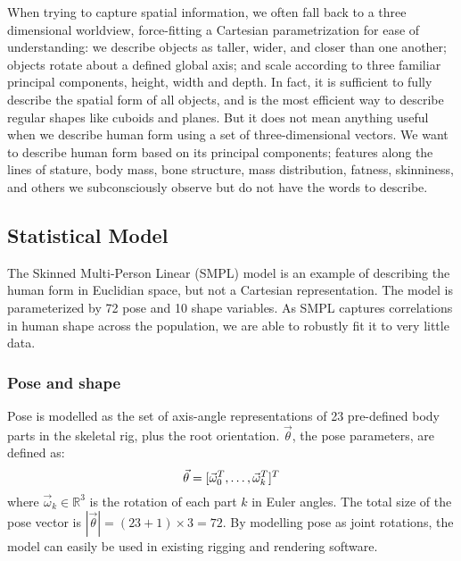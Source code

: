 \documentclass[9pt,twocolumn]{article}
\begin{document}
		\par{When trying to capture spatial information, we often fall back to a three dimensional
		worldview, force-fitting a Cartesian parametrization for ease of understanding: we describe
		objects as taller, wider, and closer than one another; objects rotate about a defined global axis;
		and scale according to three familiar principal components, height, width and depth. In fact, it
		is sufficient to fully describe the spatial form of all objects, and is the most efficient
		way to describe regular shapes like cuboids and planes. But it does not mean anything useful 	
		when we describe human form using a set of three-dimensional vectors. We want to describe
		human form based on its principal components; features along the lines of stature, body mass,
		bone structure, mass distribution, fatness, skinniness, and others we subconsciously observe
		but do not have the words to describe.}

	\subsection{Statistical Model}

		\par{The Skinned Multi-Person Linear (SMPL) model is an example of describing the human form
			in Euclidian space, but not a Cartesian representation. The model is parameterized by 72
			pose and 10 shape variables. As SMPL captures correlations in human shape across the population,
			we are able to robustly fit it to very little data.}

		\subsubsection{Pose and shape}

			\par{Pose is modelled as the set of axis-angle representations of 23 pre-defined
			body parts in the skeletal rig, plus the root orientation. $\vec{\theta}$, the pose parameters,
			are defined as:
			\begin{equation}
				\vec{\theta} = [\vec{\omega}^{T}_{0}, \mathellipsis, \vec{\omega}^{T}_{k}]^{T}
			\end{equation}
			where $\vec{\omega}_{k} \in \mathbb{R}^{3}$ is the rotation of each part $k$ in Euler angles.
			The total size of the pose vector is $|\vec{\theta}|= {(23+1)}\times{3} = 72$. By modelling
			pose as joint rotations, the model can easily be used in existing rigging and rendering software.}\\
\end{document}
